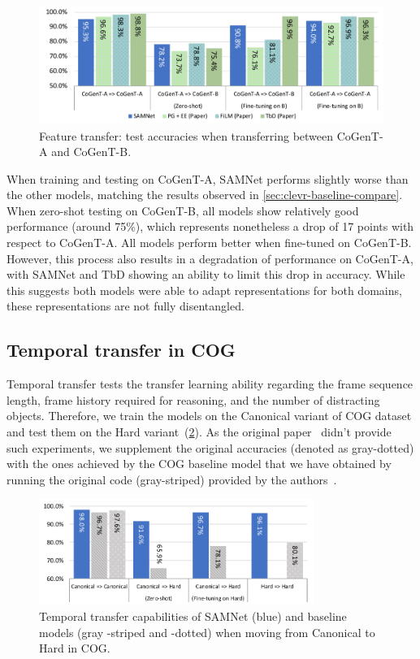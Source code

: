 \begin{figure}[htbp]
	\centering
	\includegraphics[width=\textwidth]{../img/plots/cogent_feature_transfer_baselines.pdf}
	\caption{Feature transfer: test accuracies when transferring between CoGenT-A and CoGenT-B.}
	\label{fig:CoGenT-B-results}
\end{figure}

When training and testing on CoGenT-A, SAMNet performs slightly worse than the other models, matching the results observed in \cref{sec:clevr-baseline-compare}.
When zero-shot testing on CoGenT-B, all models show relatively good performance (around 75\%), which represents nonetheless a drop of 17 points with respect to CoGenT-A.
All models perform better when fine-tuned on CoGenT-B.
However, this process also results in a degradation of performance on CoGenT-A, with SAMNet and TbD showing an ability to limit this drop in accuracy.
While this suggests both models were able to adapt representations for both domains, these representations are not fully disentangled.

\subsection{Temporal transfer in COG}
\label{sec:temporal}

Temporal transfer tests the transfer learning ability regarding the frame sequence length, frame history required for reasoning, and the number of distracting objects.
Therefore, we train the models on the Canonical variant of COG dataset and test them on the Hard variant~(\cref{fig:samnet_cog_overall_transfer}).
As the original paper~\cite{yang2018dataset} didn't provide such experiments, we supplement the original accuracies (denoted as gray-dotted) with the ones achieved by the COG baseline model that we have obtained by running the original code (gray-striped) provided by the authors~\cite{yang2018implement}.

\begin{figure}[htbp]
	\centering
	\includegraphics[width=0.8\textwidth]{../img/plots/cog_temporal_transfer_baselines.pdf}
	\caption{Temporal transfer capabilities of SAMNet (blue) and baseline models (gray -striped and -dotted) when moving from Canonical to Hard  in COG.}
	\label{fig:samnet_cog_overall_transfer}
\end{figure}

